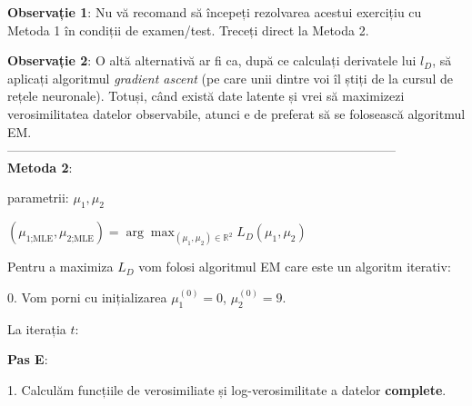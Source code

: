 \documentclass[12pt]{article}
\begin{document}
\begin{enumerate}
		\textbf{Observație 1}: Nu vă recomand să începeți rezolvarea acestui exercițiu cu Metoda 1 în condiții de examen/test. Treceți direct la Metoda 2.
		
		\textbf{Observație 2}: O altă alternativă ar fi ca, după ce calculați derivatele lui $l_D$, să aplicați algoritmul \textit{gradient ascent} (pe care unii dintre voi îl știți de la cursul de rețele neuronale). Totuși, când există date latente și vrei să maximizezi verosimilitatea datelor observabile, atunci e de preferat să se folosească algoritmul EM.
		\\--------------------------------------------------------------------------------------------\\
		\textbf{Metoda 2}:
		
		parametrii: $\mu_1,\mu_2$
		
		$(\mu_\text{1;MLE},\mu_\text{2;MLE}) = \arg \max_{(\mu_1,\mu_2)\in \mathbb{R}^2} L_D(\mu_1,\mu_2)$
		
		Pentru a maximiza $L_D$ vom folosi algoritmul EM care este un algoritm iterativ:
		
		0. Vom porni cu inițializarea $\mu_1^{(0)} = 0$, $\mu_2^{(0)} = 9$.
		
		La iterația $t$:
		
		\textbf{Pas E}:
		
		1. Calculăm funcțiile de verosimiliate și log-verosimilitate a datelor \textbf{complete}.
		

\end{enumerate}
\end{document}

